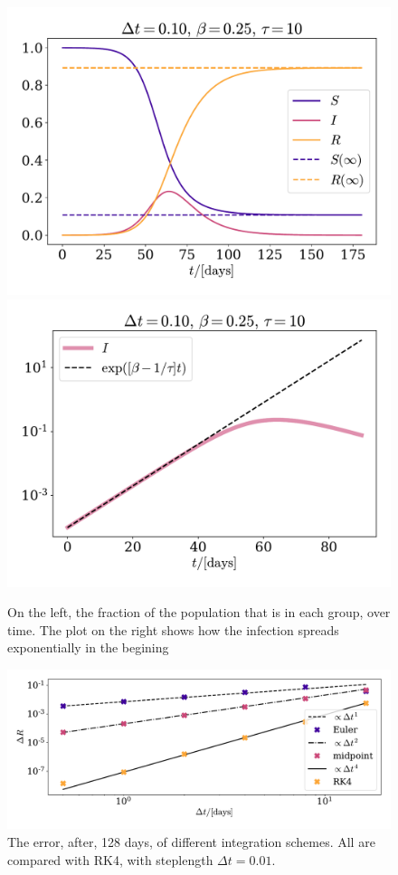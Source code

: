 \documentclass{article}
\begin{document}
    \begin{figure}[H]
        \centering
        \includegraphics[width=.49\textwidth]{../plots/2A/TestSIR}
        \includegraphics[width=.49\textwidth]{../plots/2A/TestI}
        \caption{On the left, the fraction of the population that is in each group, over time.
        The plot on the right shows how the infection spreads exponentially in the begining}
        \label{SIR}
    \end{figure}

    \begin{figure}[H]
        \centering
        \includegraphics[width=.6\textwidth]{../plots/2A/conv}
        \caption{The error, after, 128 days, of different integration schemes.
        All are compared with RK4, with steplength $\Delta t = 0.01$.}
        \label{conv det}
    \end{figure}
\end{document}
